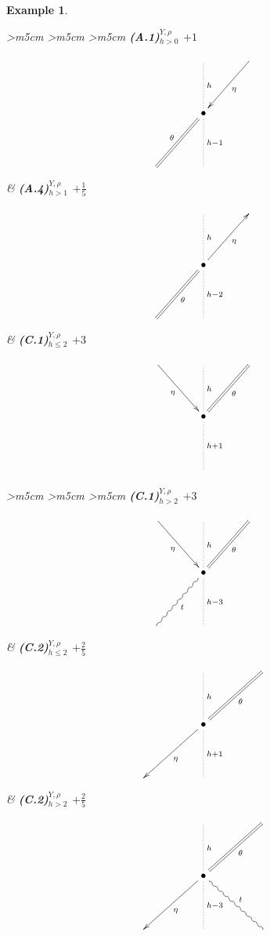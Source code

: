 \documentclass[english,letter paper,12pt,leqno]{article}
\theoremstyle{example}
\newtheorem{example}[theorem]{Example}
\numberwithin{equation}{section}
\begin{document}
\begin{example}
\begin{center}
\begin{tabular}{ >{\centering}m{5cm} >{\centering}m{5cm} >{\centering}m{5cm} }
\textbf{(A.1)${}^{Y,\rho}_{h > 0}$ $+1$}
\vspace{0.1cm}
\[
\xymatrix@C+1pc@R+1.5pc{
& \ar@{.}[d]^-{h} & \ar[dl]^-{\eta}\\
& \bullet \ar@{=}[dl]_-{\theta} \ar@{.}[d]^-{h-1} \\
& &
}
\]
&
\textbf{(A.4)${}^{Y,\rho}_{h>1}$ $+\frac{1}{5}$}
\vspace{0.1cm}
\[
\xymatrix@C+1pc@R+1.5pc{
& \ar@{.}[d]^-{h} &\\
& \bullet \ar[ur]_-{\eta} \ar@{=}[dl]^-{\theta} \ar@{.}[d]^-{h-2} \\
& &
}
\]
&
\textbf{(C.1)${}^{Y,\rho}_{h \le 2}$ $+3$}
\vspace{0.1cm}
\[
\xymatrix@C+1pc@R+1.5pc{
\ar[dr]_-{\eta} & \ar@{.}[d]^-{h} & \ar@{=}[dl]^-{\theta}\\
& \bullet \ar@{.}[d]^-{h+1} \\
& &
}
\]
\end{tabular}
\end{center}

\begin{center}
\begin{tabular}{ >{\centering}m{5cm} >{\centering}m{5cm} >{\centering}m{5cm} }
\textbf{(C.1)${}^{Y,\rho}_{h>2}$ $+3$}
\vspace{0.1cm}
\[
\xymatrix@C+1pc@R+1.5pc{
\ar[dr]_-{\eta} & \ar@{.}[d]^-{h} & \ar@{=}[dl]^-{\theta}\\
& \bullet \ar@{.}[d]^-{h-3} \ar@{~}[dl]^-{t}\\
& &
}
\]
&
\textbf{(C.2)${}^{Y,\rho}_{h \le 2}$ $+\frac{2}{5}$}
\vspace{0.1cm}
\[
\xymatrix@C+2pc@R+1.5pc{
& \ar@{.}[d]^-{h} & \ar@{=}[dl]^-{\theta} \\
& \bullet \ar[dl]^-{\eta}\ar@{.}[d]^-{h+1}\\
& &
}
\]
&
\textbf{(C.2)${}^{Y,\rho}_{h > 2}$ $+\frac{2}{5}$}
\vspace{0.1cm}
\[
\xymatrix@C+2pc@R+1.5pc{
& \ar@{.}[d]^-{h} & \ar@{=}[dl]^-{\theta} \\
& \bullet \ar[dl]^-{\eta}\ar@{.}[d]^-{h-3} \ar@{~}[dr]^-{t}\\
& &
}
\]
\end{tabular}
\end{center}


\end{example}
\end{document}
